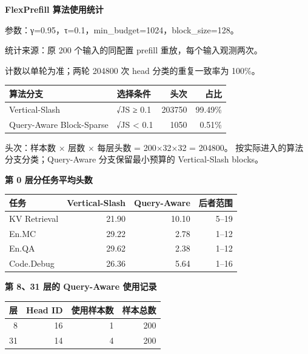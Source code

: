 \documentclass[11pt,a4paper]{article}
\newcommand{\zh}[1]{{\CJKfont #1}}
\begin{document}
\newpage
\begin{center}
{\Large\bfseries FlexPrefill \zh{算法使用统计}}
\end{center}

\zh{参数：}γ=0.95\zh{，}τ=0.1\zh{，}min\_budget=1024\zh{，}block\_size=128\zh{。}

\zh{统计来源：原} 200 \zh{个输入的同配置} prefill \zh{重放，每个输入观测两次。}
\par\zh{计数以单轮为准；两轮} 204800 \zh{次} head \zh{分类的重复一致率为} 100\%\zh{。}

\begin{tabularx}{\textwidth}{@{}lXrr@{}}
\toprule
\textbf{\zh{算法分支}} & \textbf{\zh{选择条件}} & \textbf{\zh{头次}} & \textbf{\zh{占比}} \\
\midrule
Vertical-Slash & √JS ≥ 0.1 & 203750 & 99.49\% \\
Query-Aware Block-Sparse & √JS < 0.1 & 1050 & 0.51\% \\
\bottomrule
\end{tabularx}

\zh{头次：样本数} × \zh{层数} × \zh{每层头数} = 200×32×32 = 204800\zh{。}
\zh{按实际进入的算法分支分类；}Query-Aware \zh{分支保留最小预算的} Vertical-Slash blocks\zh{。}

\vspace{4pt}
\textbf{\zh{第} 0 \zh{层分任务平均头数}}

\begin{center}
\begin{tabular}{@{}lrr@{\hspace{30pt}}r@{}}
\toprule
\textbf{\zh{任务}} & \textbf{Vertical-Slash} & \textbf{Query-Aware} & \textbf{\zh{后者范围}} \\
\midrule
KV Retrieval & 21.90 & 10.10 & 5--19 \\
En.MC & 29.22 & 2.78 & 1--12 \\
En.QA & 29.62 & 2.38 & 1--12 \\
Code.Debug & 26.36 & 5.64 & 1--16 \\
\bottomrule
\end{tabular}
\end{center}

\textbf{\zh{第} 8\zh{、}31 \zh{层的} Query-Aware \zh{使用记录}}

\begin{center}
\begin{tabular}{@{}rrrr@{}}
\toprule
\textbf{\zh{层}} & \textbf{Head ID} & \textbf{\zh{使用样本数}} & \textbf{\zh{样本总数}} \\
\midrule
8 & 16 & 1 & 200 \\
31 & 14 & 4 & 200 \\
\bottomrule
\end{tabular}
\end{center}
\end{document}
